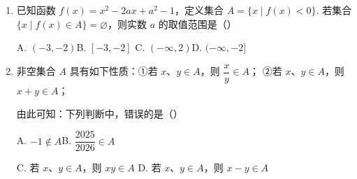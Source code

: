 \documentclass[a4paper,11pt]{article}
\begin{document}
\begin{enumerate}
\fi

\item 已知函数 $f(x)=x^2-2ax+a^2-1$，定义集合 $A=\{x\mid f(x)<0\}$. 若集合
$\{x\mid f(x)\in A\}=\varnothing$，则实数 $a$ 的取值范围是\mbox{（\quad）}

\keepwithprev
A. $(-3,-2)$\qquad B. $[-3,-2]$\qquad
C. $(-\infty,2)$\qquad D. $(-\infty,-2]$


\item 非空集合 $A$ 具有如下性质：①若 $x$、$y\in A$，则 $\dfrac xy\in A$；
②若 $x$、$y\in A$，则 $x+y\in A$；

由此可知：下列判断中，错误的是\mbox{（\quad）}

\keepwithprev
A. $-1\notin A$\qquad\qquad B. $\dfrac{2025}{2026}\in A$

C. 若 $x$、$y\in A$，则 $xy\in A$\qquad\qquad
D. 若 $x$、$y\in A$，则 $x-y\in A$


\ifanswer
\solbegin
{}
\solend

\fi

\end{enumerate}

\end{document}
